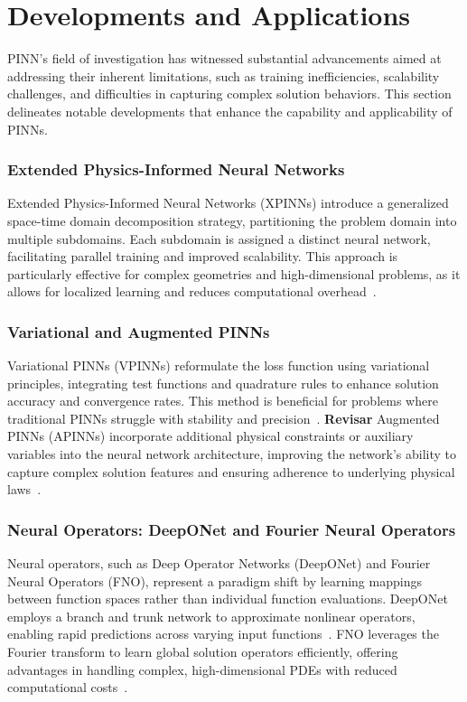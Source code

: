 \documentclass[12pt]{report} %
\theoremstyle{plain}           %
\theoremstyle{definition}      %
\theoremstyle{remark}          %
\begin{document}
\section{Developments and Applications}
PINN's field of investigation has witnessed substantial advancements aimed at addressing 
their inherent limitations, such as training inefficiencies, scalability challenges, 
and difficulties in capturing complex solution behaviors. This section delineates notable 
developments that enhance the capability and applicability of PINNs.

\subsubsection{Extended Physics-Informed Neural Networks}
Extended Physics-Informed Neural Networks (XPINNs) introduce a generalized space-time domain 
decomposition strategy, partitioning the problem domain into multiple subdomains. 
Each subdomain is assigned a distinct neural network, facilitating parallel training 
and improved scalability. This approach is particularly effective for complex geometries 
and high-dimensional problems, as it allows for localized learning and reduces computational 
overhead~\cite{Hu_2022}.

\subsubsection{Variational and Augmented PINNs}
Variational PINNs (VPINNs) reformulate the loss function using variational principles, 
integrating test functions and quadrature rules to enhance solution accuracy and convergence 
rates. This method is beneficial for problems where traditional PINNs struggle with stability 
and precision~\cite{kharazmi2019variationalphysicsinformedneuralnetworks}. \textbf{Revisar} Augmented PINNs 
(APINNs) incorporate additional physical constraints or auxiliary variables into the neural network architecture, improving the network's 
ability to capture complex solution features and ensuring adherence to 
underlying physical laws~\cite{Hu_2023}.

\subsubsection{Neural Operators: DeepONet and Fourier Neural Operators}
Neural operators, such as Deep Operator Networks (DeepONet) and Fourier Neural 
Operators (FNO), represent a paradigm shift by learning mappings between function 
spaces rather than individual function evaluations. DeepONet employs a branch and 
trunk network to approximate nonlinear operators, enabling rapid predictions 
across varying input functions~\cite{Lu_2021}. FNO leverages the Fourier 
transform to learn global solution operators efficiently, offering advantages in 
handling complex, high-dimensional PDEs with reduced computational costs~\cite{li2021fourierneuraloperatorparametric}.
\end{document}
